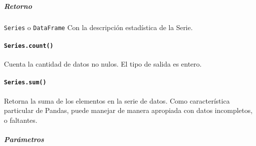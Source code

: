 \subparagraph{Retorno}
\texttt{Series} o \texttt{DataFrame}
Con la descripción estadística de la Serie.

\paragraph{\texttt{Series.count()}} Cuenta la cantidad de datos no nulos. El
tipo de salida es entero.

\paragraph{\texttt{Series.sum()}} Retorna la suma de los elementos en la serie
de datos. Como característica particular de Pandas, puede manejar de manera
apropiada con datos incompletos, o faltantes.

\subparagraph{Parámetros}

